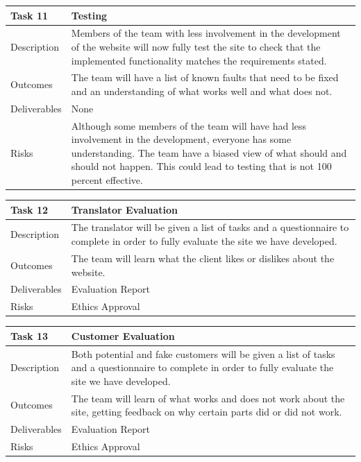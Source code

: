 \documentclass{l3proj}
\begin{document}
\begin{center}
    \begin{tabular}{ | l | p{12cm} |}
    \hline	
    Task 11 & Testing \\ \hline
    Description & Members of the team with less involvement in the development of the website will now fully test the site to check that the implemented functionality matches the requirements stated. \\ \hline   
    Outcomes & The team will have a list of known faults that need to be fixed and an understanding of what works well and what does not. \\ \hline
    Deliverables & None \\ \hline
    Risks & Although some members of the team will have had less involvement in the development, everyone has some understanding. The team have a biased view of what should and should not happen. This could lead to testing that is not 100 percent effective. \\ 
    \hline
    \end{tabular}
\end{center}

\begin{center}
    \begin{tabular}{ | l | p{12cm} |}
    \hline	
    Task 12 & Translator Evaluation \\ \hline
    Description & The translator will be given a list of tasks and a questionnaire to complete in order to fully evaluate the site we have developed. \\ \hline   
    Outcomes & The team will learn what the client likes or dislikes about the website. \\ \hline
    Deliverables & Evaluation Report \\ \hline
    Risks & Ethics Approval \\ 
    \hline
    \end{tabular}
\end{center}

\begin{center}
    \begin{tabular}{ | l | p{12cm} |}
    \hline	
    Task 13 & Customer Evaluation \\ \hline
    Description & Both potential and fake customers will be given a list of tasks and a questionnaire to complete in order to fully evaluate the site we have developed. \\ \hline   
    Outcomes & The team will learn of what works and does not work about the site, getting feedback on why certain parts did or did not work. \\ \hline
    Deliverables & Evaluation Report \\ \hline
    Risks & Ethics Approval \\ 
    \hline
    \end{tabular}
\end{center}
\end{document}
